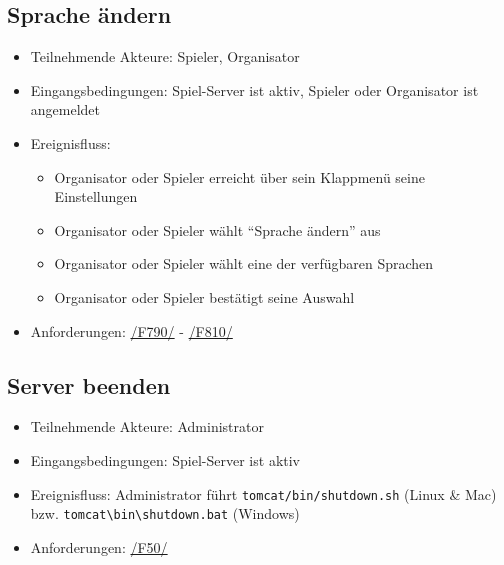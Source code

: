 \documentclass[a4paper]{scrreprt}
\begin{document}
    \subsection{Sprache ändern}
    \begin{itemize}
    \item Teilnehmende Akteure: \Gls{Spieler}, \Gls{Organisator}
    \item Eingangsbedingungen: \Gls{Spiel-Server} ist aktiv, \Gls{Spieler} oder \Gls{Organisator} ist angemeldet
    \item Ereignisfluss:
        \begin{itemize}
            \item \Gls{Organisator} oder \Gls{Spieler} erreicht über sein Klappmenü seine Einstellungen
            \item \Gls{Organisator} oder \Gls{Spieler} wählt \enquote{Sprache ändern} aus
            \item \Gls{Organisator} oder \Gls{Spieler} wählt eine der verfügbaren Sprachen
            \item \Gls{Organisator} oder \Gls{Spieler} bestätigt seine Auswahl
        \end{itemize}
        \item Anforderungen: \hyperlink{F790}{/F790/} - \hyperlink{F810}{/F810/}
    \end{itemize}

    \subsection{Server beenden}
    \begin{itemize}
        \item Teilnehmende Akteure: \Gls{Administrator}
        \item Eingangsbedingungen: \Gls{Spiel-Server} ist aktiv
        \item Ereignisfluss: \Gls{Administrator} führt \texttt{tomcat/bin/shutdown.sh} (Linux \& Mac) bzw.  \texttt{tomcat\textbackslash bin\textbackslash shutdown.bat} (Windows)
        \item Anforderungen: \hyperlink{F50}{/F50/}
    \end{itemize}
\end{document}
